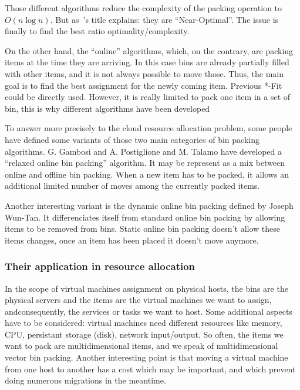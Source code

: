 \documentclass[a4paper,11pt]{article}
\begin{document}
Those different algorithms reduce the complexity of the packing operation to
$O(n\log{n})$. But as~\cite{maths:bpheuristics}'s title explains: they are
“Near-Optimal”.  The issue is finally to find the best ratio optimality/complexity.

On the other hand, the “online” algorithms, which, on the contrary, are packing
items at the time they are arriving. In this case bins are already partially
filled with other items, and it is not always possible to move those. Thus, the
main goal is to find the best assignment for the newly coming item. Previous
*-Fit could be directly used. However, it is really limited to pack one item in
a set of bin, this is why different algorithms have been developed

To answer more precisely to the cloud resource allocation problem, some people
have defined some variants of those two main categories of bin packing
algorithms. G. Gambosi and A. Postiglione and M. Talamo have developed a
“relaxed online bin packing” algorithm\cite{maths:relaxedonlinebp}. It may be
represent as a mix between online and offline bin packing. When a new item has
to be packed, it allows an additional limited number of moves among the
currently packed items.

Another interesting variant is the dynamic online bin packing defined by Joseph
Wun-Tan.  It differenciates itself from standard online bin packing by allowing
items to be removed from bins. Static online bin packing doesn't allow these
items changes, once an item has been placed it doesn't move anymore.

\subsubsection{Their application in resource allocation}

In the scope of virtual machines assignment on physical hosts, the bins are the
physical servers and the items are the virtual machines we want to assign,
andconsequently, the services or tasks we want to host. Some additional aspects
have to be considered: virtual machines need different resources like memory,
CPU, persistant storage (disk), network input/output. So often, the items we
want to pack are multidimensional items, and we speak of multidimensional
vector bin packing. Another interesting point is that moving a virtual machine
from one host to another has a cost which may be important, and which prevent 
doing numerous migrations in the meantime.
\end{document}
